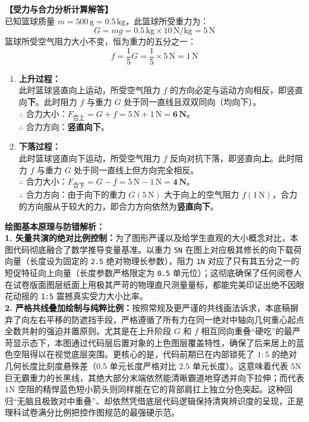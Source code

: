 \documentclass[12pt, a4paper]{ctexrep}
\begin{document}
\vspace{0.4cm}

\textbf{【受力与合力分析计算解答】}\\
已知篮球质量 $m = 500\,\text{g} = 0.5\,\text{kg}$，此篮球所受重力为：
$$ G = mg = 0.5\,\text{kg} \times 10\,\text{N/kg} = 5\,\text{N} $$
篮球所受空气阻力大小不变，恒为重力的五分之一：
$$ f = \frac{1}{5} G = \frac{1}{5} \times 5\,\text{N} = 1\,\text{N} $$

\begin{enumerate}
    \item \textbf{上升过程：}\\
    此时篮球竖直向上运动，所受空气阻力 $f$ 的方向必定与运动方向相反，即竖直向\textbf{下}。此时阻力 $f$ 与重力 $G$ 处于同一直线且双双同向（均向下）。\\
    $\therefore$ 合力大小：$F_{\text{合上}} = G + f = 5\,\text{N} + 1\,\text{N} = \mathbf{6\,\text{N}}$。\\
    $\therefore$ 合力方向：\textbf{竖直向下}。
    
    \item \textbf{下落过程：}\\
    此时篮球竖直向下运动，所受空气阻力 $f$ 反向对抗下落，即竖直向\textbf{上}。此时阻力 $f$ 与重力 $G$ 处于同一直线上但方向完全相反。\\
    $\therefore$ 合力大小：$F_{\text{合下}} = G - f = 5\,\text{N} - 1\,\text{N} = \mathbf{4\,\text{N}}$。\\
    $\therefore$ 合力方向：由于向下的重力 $G (5\,\text{N})$ 大于向上的空气阻力 $f (1\,\text{N})$，合力的方向服从于较大的力，即合力方向依然为\textbf{竖直向下}。
\end{enumerate}

\vspace{0.6cm}

{\small\color{blue!70!black}
\textbf{绘图基本原理与防错解析：}\\
\textbf{1. 矢量共演的绝对比例控制：}为了图形严谨以及给学生直观的大小概念对比，本图代码彻底融合了数学推导变量基准。以重力 \texttt{5N} 在图上对应极其修长的向下载荷向量（长度设为固定的 \texttt{2.5} 绝对物理长参数），阻力 \texttt{1N} 对应了只有其五分之一的短促特征向上向量（长度参数严格限定为 \texttt{0.5} 单元位）；这彻底确保了任何阅卷人在试卷版面图层纸面上用极其严苛的物理直尺测量量标，都能完美印证出绝不因眼花动摇的 \texttt{1:5} 震撼真实受力大小比率。\\
\textbf{2. 严格共线叠加绘制与纯粹比例：}按照常规及更严谨的共线画法诉求，本底稿摒弃了向左右平移的防遮挡手段，严格遵循了所有力在同一绝对中轴向几何重心起点全数共射的强迫并置原则。尤其是在上升阶段 $G$ 和 $f$ 相互同向重叠“硬吃”的最严苛显示态下，本图通过代码层后置对象的上色图层覆盖特性，确保了后来居上的蓝色空阻得以在视觉底层突围。更核心的是，代码前期已在内部锁死了 $1:5$ 的绝对几何长度比刻度悬殊差（$0.5$ 单元长度严格对比 $2.5$ 单元长度）。这意味着代表 $5\text{N}$ 巨无霸重力的长黑线，其绝大部分末端依然能清晰霸道地穿透并向下拉伸；而代表 $1\text{N}$ 空阻的精悍蓝色短小箭头则同样能在它的背部肩扛上独立分色突起。这种回归“无脑且极致对中重叠”、却依然凭借底层代码逻辑保持清爽辨识度的呈现，正是理科试卷满分比例把控作图规范的最强硬示范。
}
\end{document}

